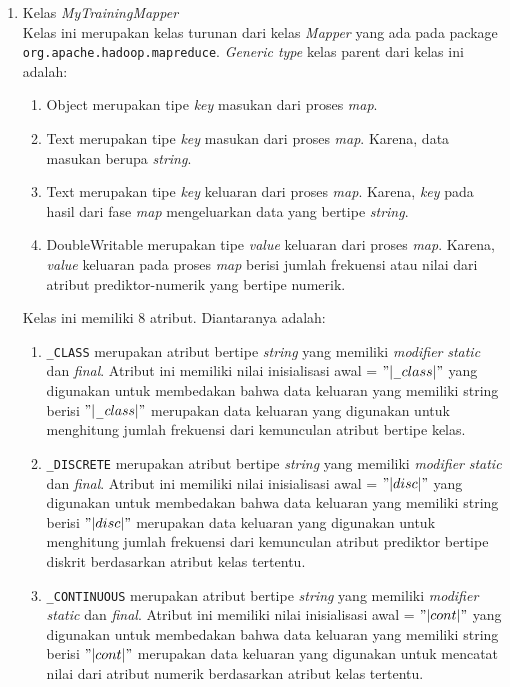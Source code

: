 \begin{enumerate}
	\item{Kelas \textit{MyTrainingMapper}}\\
	Kelas ini merupakan kelas turunan dari kelas \textit{Mapper} yang ada pada package \verb|org.apache.hadoop.mapreduce|. \textit{Generic type} kelas parent dari kelas ini adalah:
	\begin{enumerate}
		\item{Object} merupakan tipe \textit{key} masukan dari proses \textit{map}.
		\item{Text} merupakan tipe \textit{key} masukan dari proses \textit{map}. Karena, data masukan berupa \textit{string}.
		\item{Text} merupakan tipe \textit{key} keluaran dari proses \textit{map}. Karena, \textit{key} pada hasil dari fase \textit{map} mengeluarkan data yang bertipe \textit{string}.
		\item{DoubleWritable} merupakan tipe \textit{value} keluaran dari proses \textit{map}. Karena, \textit{value} keluaran pada proses \textit{map} berisi jumlah frekuensi atau nilai dari atribut prediktor-numerik yang bertipe numerik.
	\end{enumerate}
	Kelas ini memiliki 8 atribut. Diantaranya adalah:
	\begin{enumerate}
		\item \verb|_CLASS| merupakan atribut bertipe \textit{string} yang memiliki \textit{modifier} \textit{static} dan \textit{final}. Atribut ini memiliki nilai inisialisasi awal = $"|$\verb|_|$class|"$ yang digunakan untuk membedakan bahwa data keluaran yang memiliki string berisi $"|$\verb|_|$class|"$ merupakan data keluaran yang digunakan untuk menghitung jumlah frekuensi dari kemunculan atribut bertipe kelas.
		\item \verb|_DISCRETE| merupakan atribut bertipe \textit{string} yang memiliki \textit{modifier} \textit{static} dan \textit{final}. Atribut ini memiliki nilai inisialisasi awal = $"|disc|"$ yang digunakan untuk membedakan bahwa data keluaran yang memiliki string berisi $"|disc|"$ merupakan data keluaran yang digunakan untuk menghitung jumlah frekuensi dari kemunculan atribut prediktor bertipe diskrit berdasarkan atribut kelas tertentu.
		\item \verb|_CONTINUOUS| merupakan atribut bertipe \textit{string} yang memiliki \textit{modifier} \textit{static} dan \textit{final}. Atribut ini memiliki nilai inisialisasi awal = $"|cont|"$ yang digunakan untuk membedakan bahwa data keluaran yang memiliki string berisi $"|cont|"$ merupakan data keluaran yang digunakan untuk mencatat nilai dari atribut numerik berdasarkan atribut kelas tertentu.

\end{enumerate}
\end{enumerate}
